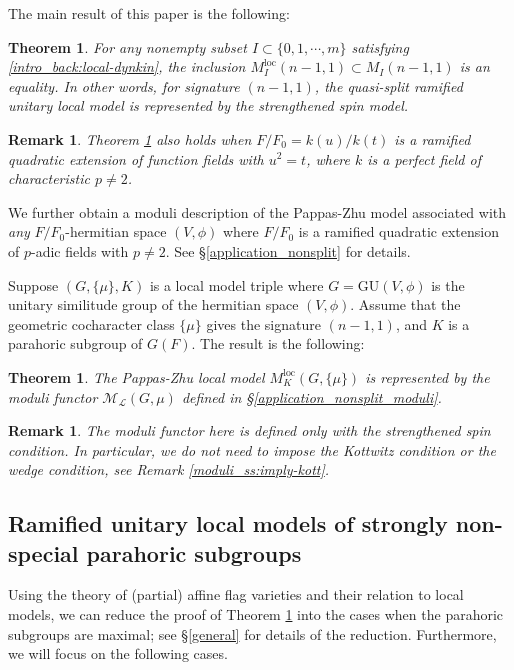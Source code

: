 \documentclass[pdflatex,sn-mathphys-num]{sn-jnl}%
\theoremstyle{thmstyleone}%
\newtheorem{theorem}[subsubsection]{Theorem}%
\theoremstyle{thmstyletwo}%
\newtheorem{remark}[subsubsection]{Remark}%
\numberwithin{equation}{subsection}
\theoremstyle{thmstylethree}%
\newcommand{\CL}{\ensuremath{\mathcal{L}}\xspace}
\newcommand{\CM}{\ensuremath{\mathcal{M}}\xspace}
\newcommand{\GU}{\mathrm{GU}}
\newcommand{\loc}{\ensuremath{\mathrm{loc}}\xspace}
\begin{document}
The main result of this paper is the following:
		
\begin{theorem}\label{intro_back:main}
For any nonempty subset $I\subset\{0,1,\cdots,m\}$ satisfying \eqref{intro_back:local-dynkin}, the inclusion $M_I^\loc(n-1,1)\subset M_I(n-1,1)$ is an equality.
In other words, for signature $(n-1,1)$, the quasi-split ramified unitary local model is represented by the strengthened spin model.
\end{theorem}

\begin{remark}
Theorem \ref{intro_back:main} also holds when $F/F_0=k(u)/k(t)$ is a ramified quadratic extension of function fields with $u^2=t$, where $k$ is a perfect field of characteristic $p\neq 2$. 
\end{remark}

We further obtain a moduli description of the Pappas-Zhu model associated with \emph{any} $F/F_0$-hermitian space $(V,\phi)$ where $F/F_0$ is a ramified quadratic extension of $p$-adic fields with $p\neq 2$. See \S \ref{application_nonsplit} for details.

Suppose $(G,\{\mu\},K)$ is a local model triple \cite[\S 2.1]{HPR} where $G=\GU(V,\phi)$ is the unitary similitude group of the hermitian space $(V,\phi)$. Assume that the geometric cocharacter class $\{\mu\}$ gives the signature $(n-1,1)$, and $K$ is a parahoric subgroup of $G(F)$.
The result is the following:
\begin{theorem}\label{intro_back:non-split}
The Pappas-Zhu local model $M^\loc_K(G,\{\mu\})$ is represented by the moduli functor $\CM_\CL(G,\mu)$ defined in \S \ref{application_nonsplit_moduli}.
\end{theorem}

\begin{remark}
The moduli functor here is defined only with the strengthened spin condition. In particular, we do not need to impose the Kottwitz condition or the wedge condition, see Remark \ref{moduli_ss:imply-kott}.
\end{remark}


\subsection{Ramified unitary local models of strongly non-special parahoric subgroups}
Using the theory of (partial) affine flag varieties and their relation to local models, we can reduce the proof of Theorem \ref{intro_back:main} into the cases when the parahoric subgroups are maximal; see \S \ref{general} for details of the reduction. 
Furthermore, we will focus on the following cases.
\end{document}
